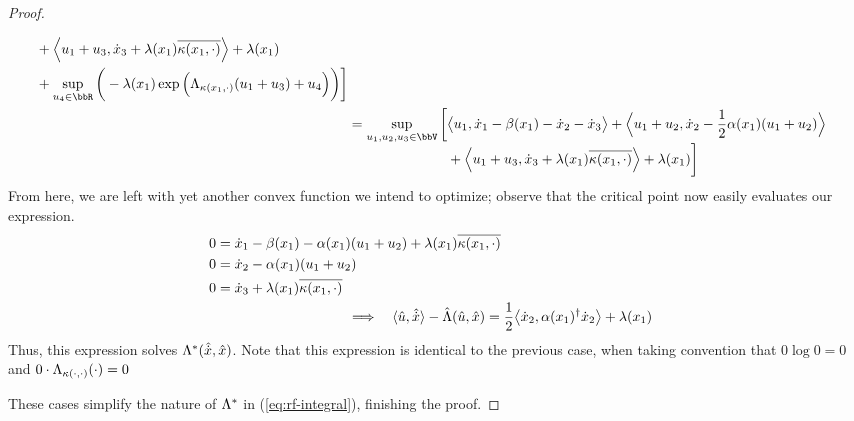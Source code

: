\begin{proof}
\begin{enumerate}
\begin{align*}
\begin{aligned}[t]
          &+ \Bprj{\momentVar_1+\momentVar_3}{\diffVar_3 + \affInt(\stateVar_1)\overline{\affDist(\stateVar_1,\cdot)}} 
          + \affInt(\stateVar_1) \\
          &+ \sup_{\momentVar_4 \in \bbR} \bigg(- \affInt(\stateVar_1) \exp\Big(\ode_{\affDist(\stateVar_1,\cdot)}(\momentVar_1+\momentVar_3) + \momentVar_4\Big) \bigg)
          \bigg]
        \end{aligned} \\
        &= \sup_{\momentVar_1,\momentVar_2,\momentVar_3 \in \vecSpace} \bigg[ \begin{aligned}[t]
          & \bprj{\momentVar_1}{\diffVar_1 - \affDrift(\stateVar_1) - \diffVar_2 - \diffVar_3} 
          + \Bprj{\momentVar_1+\momentVar_2}{\diffVar_2 
          - \frac12\affDiff(\stateVar_1)(\momentVar_1+\momentVar_2)} \\
          &+ \Bprj{\momentVar_1+\momentVar_3}{\diffVar_3 + \affInt(\stateVar_1)\overline{\affDist(\stateVar_1,\cdot)}} 
          + \affInt(\stateVar_1) 
          \bigg]
        \end{aligned}
      \end{align*}
      From here, we are left with yet another convex function we intend to optimize; observe that the critical point now easily evaluates our expression.
      \begin{align*}
        &\begin{aligned}
          0 &= \diffVar_1 - \affDrift(\stateVar_1) - \affDiff(\stateVar_1) (\momentVar_1 + \momentVar_2) + \affInt(\stateVar_1) \overline{\affDist(\stateVar_1, \cdot)} \\
          0 &= \diffVar_2 - \affDiff(\stateVar_1) ( \momentVar_1 + \momentVar_2 ) \\
          0 &= \diffVar_3 + \affInt(\stateVar_1) \overline{\affDist(\stateVar_1, \cdot)} 
        \end{aligned} \\
        &\hspace{35mm}\Longrightarrow\quad
        \begin{aligned}[t]
          \prj{\hat\momentVar}{\hat\diffVar} - \hat\ode(\hat\momentVar,\hat\stateVar)
          &= \frac12 \bprj{\diffVar_2}{\affDiff(\stateVar_1)^\dagger\diffVar_2} + \affInt(\stateVar_1)
        \end{aligned}
      \end{align*}
      Thus, this expression solves $\Lambda^*(\hat{\dot{x}},\hat{x})$.
      Note that this expression is identical to the previous case, when taking convention that $0 \log 0 = 0$ and $0 \cdot \Lambda_{\kappa(\cdot,\cdot)}(\cdot) = 0$
  \end{enumerate}
  These cases simplify the nature of $\Lambda^*$ in (\ref{eq:rf-integral}), finishing the proof.
\end{proof}
